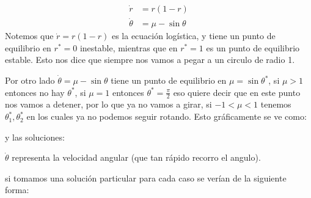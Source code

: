 \begin{ejemplo}
  \begin{align*}
    \dot{r} &= r(1-r) \\
    \dot{\theta}&= \mu-\sin\theta
  \end{align*}
  Notemos que $\dot{r}=r(1-r)$ es la ecuación logística, y tiene un punto de equilibrio en $r^*=0$ inestable, mientras que en $r^*=1$ es un punto de equilibrio estable. Esto nos dice que siempre nos vamos a pegar a un circulo de radio 1.

  Por otro lado
  $\dot{\theta}=\mu-\sin\theta$ tiene un punto de equilibrio en $ \mu=\sin\theta^*$, si  $ \mu>1$ entonces no hay $\theta^*$, si $ \mu=1$ entonces $\theta^*=\frac{\pi}{2}$ eso quiere decir que en este punto nos vamos a detener, por lo que ya no vamos a girar, si $-1<\mu<1$ tenemos $\theta_1^*, \theta_2^*$ en los cuales ya no podemos seguir rotando. Esto gráficamente se ve como:

  \begin{figure}[H]
   \centering
    \subfloat[$ \mu>1$]{
      \texttt{[image: gb7]}}
    \subfloat[$ \mu=1$]{
      \texttt{[image: gb8]}}
    \subfloat[$ \mu>1$]{
      \texttt{[image: gb9]}}
  \end{figure}
  y las soluciones:
  \begin{figure}[H]
   \centering
    \subfloat[$ \mu>1$]{
      \texttt{[image: gb10]}}
    \subfloat[$ \mu=1$]{
      \texttt{[image: gb11]}}
    \subfloat[$mu>1$]{
      \texttt{[image: gb12]}}
  \end{figure}

  \begin{tcolorbox}[colback=Black!4, colframe=White,arc=2mm]
  \begin{recordatorio}
    $\dot{\theta}$ representa la velocidad angular (que tan rápido recorro el angulo). 
  \end{recordatorio}
  \end{tcolorbox}
\end{ejemplo}
si tomamos una solución particular para cada caso se verían de la siguiente forma:
\begin{figure}[H]
 \centering
  \subfloat[$T = \infty$]{
    \texttt{[image: gb14]}}
\end{figure}

